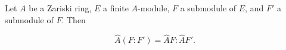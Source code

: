Let $A$ be a Zariski ring, $E$ a finite $A$-module, $F$ a submodule of $E$, and $F'$ a submodule of $F$. Then

$$\hat{A}(F : F') = \hat{A}F : \hat{A}F'.$$
